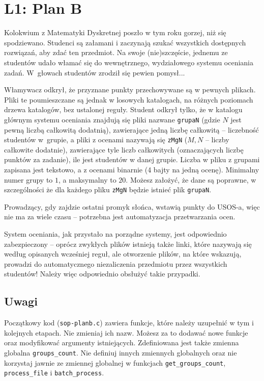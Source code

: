 \documentclass[addpoints,a4paper]{exam}
\begin{document}
\cellwidth{2cm}
\noindent \gradetable[h]

\section*{L1: Plan B}
Kolokwium z Matematyki Dyskretnej poszło w tym roku gorzej, niż się spodziewano. 
Studenci są załamani i zaczynają szukać wszystkich dostępnych rozwiązań, aby zdać ten przedmiot.
Na swoje (nie)szczęście, jednemu ze studentów udało włamać się do wewnętrznego, wydziałowego systemu oceniania zadań. W~głowach studentów zrodził się pewien pomysł...

Włamywacz odkrył, że przyznane punkty przechowywane są w pewnych plikach. Pliki te poumieszczane są jednak w losowych katalogach, na różnych poziomach drzewa katalogów, bez ustalonej reguły. Student odkrył tylko, że w katalogu głównym systemu oceniania znajdują się pliki nazwane \verb|grupaN| (gdzie $N$ jest pewną liczbą całkowitą dodatnią), zawierające jedną liczbę całkowitą -- liczebność studentów w~grupie, a pliki z ocenami nazywają się \verb|zMgN| ($M,N$ -- liczby całkowite dodatnie), zawierające tyle liczb całkowitych (oznaczających liczbę punktów za zadanie), ile jest studentów w danej grupie. Liczba w pliku z grupami zapisana jest tekstowo, a z ocenami binarnie (4 bajty na jedną ocenę). Minimalny numer grupy to $1$, a maksymalny to $20$. Możesz założyć, że dane są poprawne, w szczególności że dla każdego pliku \verb|zMgN| będzie istnieć plik \verb|grupaN|.

Prowadzący, gdy zajdzie ostatni promyk słońca, wstawią punkty do USOS-a, więc nie ma za wiele czasu -- potrzebna jest automatyzacja przetwarzania ocen. 

System oceniania, jak przystało na porządne systemy, jest odpowiednio zabezpieczony -- oprócz zwykłych plików istnieją także linki, które nazywają się według opisanych wcześniej reguł, ale otworzenie plików, na które wskazują, prowadzi do automatycznego niezaliczenia przedmiotu przez wszystkich studentów! Należy więc odpowiednio obsłużyć takie przypadki.

\subsection*{Uwagi}

Początkowy kod (\verb|sop-planb.c|) zawiera funkcje, które należy uzupełnić w tym i kolejnych etapach. Nie zmieniaj ich nazw. Możesz za to dodawać nowe funkcje oraz modyfikować argumenty istniejących. Zdefiniowana jest także zmienna globalna \verb|groups_count|. Nie definiuj innych zmiennych globalnych oraz nie korzystaj jawnie ze zmiennej globalnej w funkcjach \verb|get_groups_count|, \verb|process_file| i \verb|batch_process|.
\end{document}
